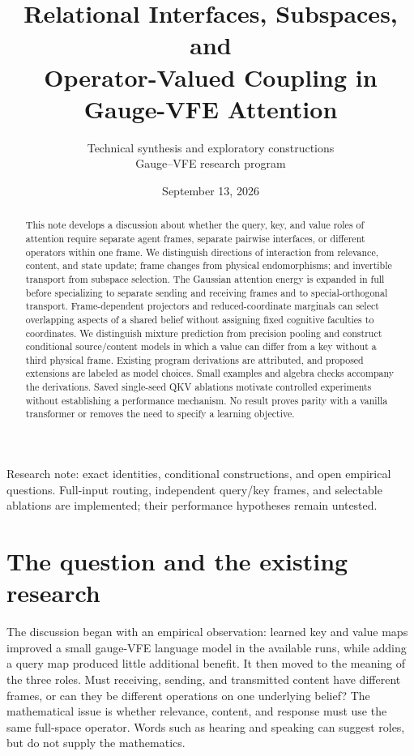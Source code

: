 \documentclass[11pt,letterpaper]{article}
\title{Relational Interfaces, Subspaces, and\\ Operator-Valued Coupling in Gauge-VFE Attention}
\author{Technical synthesis and exploratory constructions\\Gauge--VFE research program}
\date{September 13, 2026}
\theoremstyle{remark}
\begin{document}
\maketitle
\begin{abstract}
This note develops a discussion about whether the query, key, and value roles of attention require separate agent frames, separate pairwise interfaces, or different operators within one frame. We distinguish directions of interaction from relevance, content, and state update; frame changes from physical endomorphisms; and invertible transport from subspace selection. The Gaussian attention energy is expanded in full before specializing to separate sending and receiving frames and to special-orthogonal transport. Frame-dependent projectors and reduced-coordinate marginals can select overlapping aspects of a shared belief without assigning fixed cognitive faculties to coordinates. We distinguish mixture prediction from precision pooling and construct conditional source/content models in which a value can differ from a key without a third physical frame. Existing program derivations are attributed, and proposed extensions are labeled as model choices. Small examples and algebra checks accompany the derivations. Saved single-seed QKV ablations motivate controlled experiments without establishing a performance mechanism. No result proves parity with a vanilla transformer or removes the need to specify a learning objective.
\end{abstract}
\begin{center}
\small Research note: exact identities, conditional constructions, and open empirical questions. Full-input routing, independent query/key frames, and selectable ablations are implemented; their performance hypotheses remain untested.
\end{center}
\tableofcontents
\clearpage

\section{The question and the existing research}
The discussion began with an empirical observation: learned key and value maps improved a small gauge-VFE language model in the available runs, while adding a query map produced little additional benefit. It then moved to the meaning of the three roles. Must receiving, sending, and transmitted content have different frames, or can they be different operations on one underlying belief? The mathematical issue is whether relevance, content, and response must use the same full-space operator. Words such as hearing and speaking can suggest roles, but do not supply the mathematics.
\end{document}
